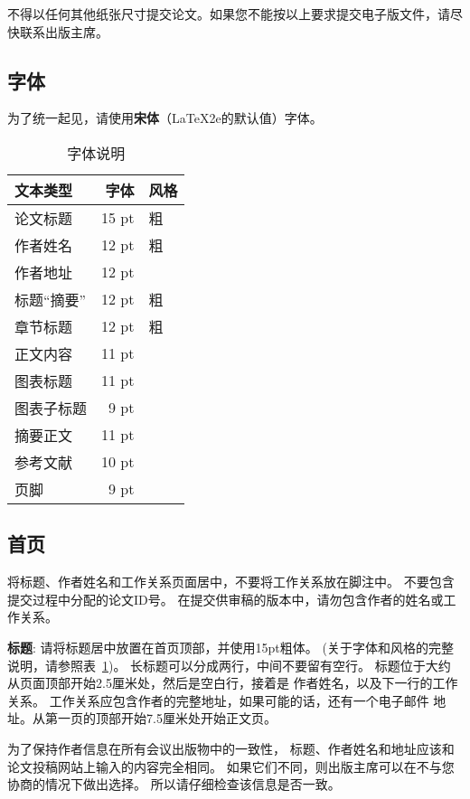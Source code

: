 \documentclass[11pt]{article}
\begin{document}
\begin{CJK*}{UTF8}{gbsn}
\noindent 不得以任何其他纸张尺寸提交论文。如果您不能按以上要求提交电子版文件，请尽快联系出版主席。


\subsection{字体}

为了统一起见，请使用{\bf 宋体}（\LaTeX2e{}的默认值）字体。

\begin{table}[h]
\begin{center}
\begin{tabular}{|l|rl|}
\hline \bf 文本类型 & \bf 字体 & \bf 风格 \\ \hline
论文标题 & 15 pt & 粗 \\
作者姓名 & 12 pt & 粗 \\
作者地址 & 12 pt & \\
标题“摘要” & 12 pt & 粗 \\
章节标题 & 12 pt & 粗 \\
正文内容 & 11 pt  &\\
图表标题 & 11 pt & \\
图表子标题 & 9 pt & \\
摘要正文 & 11 pt & \\
参考文献 & 10 pt & \\
页脚 & 9 pt & \\
\hline
\end{tabular}
\end{center}
\caption{\label{font-table} 字体说明}
\end{table}

\subsection{首页}
\label{ssec:first}

将标题、作者姓名和工作关系页面居中，不要将工作关系放在脚注中。
不要包含提交过程中分配的论文ID号。
在提交供审稿的版本中，请勿包含作者的姓名或工作关系。

{\bf 标题}: 请将标题居中放置在首页顶部，并使用15pt粗体。 (关于字体和风格的完整说明，请参照表~\ref{font-table})。
长标题可以分成两行，中间不要留有空行。
标题位于大约从页面顶部开始2.5厘米处，然后是空白行，接着是
作者姓名，以及下一行的工作关系。
工作关系应包含作者的完整地址，如果可能的话，还有一个电子邮件
地址。从第一页的顶部开始7.5厘米处开始正文页。

为了保持作者信息在所有会议出版物中的一致性，
标题、作者姓名和地址应该和论文投稿网站上输入的内容完全相同。
如果它们不同，则出版主席可以在不与您协商的情况下做出选择。
所以请仔细检查该信息是否一致。



\end{CJK*}
\end{document}
